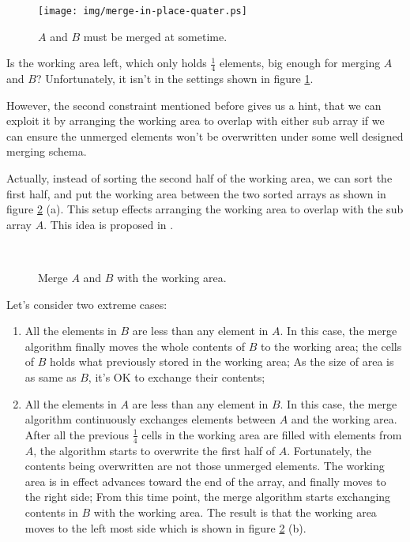 \documentclass[UTF8]{article}
\begin{document}
\begin{figure}[htbp]
 \centering
 \texttt{[image: img/merge-in-place-quater.ps]}
 \caption{$A$ and $B$ must be merged at sometime.}
 \label{fig:merge-in-place-quater}
\end{figure}

Is the working area left, which only holds $\frac{1}{4}$ elements, big enough for merging
$A$ and $B$? Unfortunately, it isn't in the settings shown in figure \ref{fig:merge-in-place-quater}.

However, the second constraint mentioned before gives us a hint, that we can exploit
it by arranging the working area to overlap with either sub array if we can ensure
the unmerged elements won't be overwritten under some well designed merging schema.

Actually, instead of sorting the second half of the working area, we can sort the first
half, and put the working area between the two sorted arrays as shown in figure \ref{fig:merge-in-place-setup} (a).
This setup effects arranging the working area to overlap with the sub array $A$. This idea
is proposed in \cite{msort-in-place}.

\begin{figure}[htbp]
 \centering
  \\
 \caption{Merge $A$ and $B$ with the working area.}
 \label{fig:merge-in-place-setup}
\end{figure}

Let's consider two extreme cases:

\begin{enumerate}
\item All the elements in $B$ are less than any element in $A$. In this case, the merge algorithm
finally moves the whole contents of $B$ to the working area; the cells of $B$ holds what previously
stored in the working area; As the size of area is as same as $B$, it's OK to exchange their contents;
\item All the elements in $A$ are less than any element in $B$. In this case, the merge algorithm
continuously exchanges elements between $A$ and the working area. After all the previous $\frac{1}{4}$
cells in the working area are filled with elements from $A$, the algorithm starts to overwrite the
first half of $A$. Fortunately, the contents being overwritten are not those unmerged elements.
The working area is in effect advances toward the end of the array, and finally moves to the right
side; From this time point, the merge algorithm starts exchanging contents in $B$ with the working area.
The result is that the working area moves to the left most side which is shown in figure \ref{fig:merge-in-place-setup} (b).
\end{enumerate}
\end{document}
